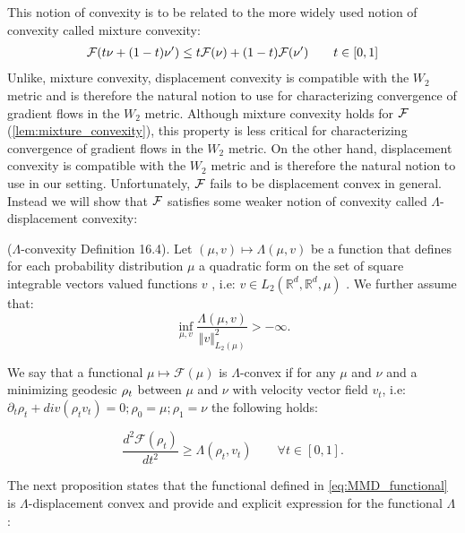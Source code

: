 This notion of convexity is to be related to the more widely used notion of convexity called mixture convexity:
\begin{align}
	{{\mathcal F}}(t\nu +(1-t)\nu')\leq t{{\mathcal F}}(\nu)+(1-t){{\mathcal F}}(\nu') \qquad t\in [0,1]
\end{align}
Unlike, mixture convexity, displacement convexity is compatible with the $W_2$ metric and is therefore the natural notion to use for characterizing convergence of gradient flows in the $W_2$ metric.
Although mixture convexity holds for ${{\mathcal F}}$ (\ref{lem:mixture_convexity}), this property is less critical for characterizing convergence of gradient flows in the $W_2$ metric. On the other hand, displacement convexity is compatible with the $W_2$ metric \cite{Bottou:2017} and is therefore the natural notion to use in our setting. Unfortunately, ${{\mathcal F}}$ fails to be displacement convex in general. Instead we will show that ${{\mathcal F}}$ satisfies some weaker notion of convexity called $\Lambda$-displacement convexity:
%
\begin{definition}
($\Lambda$-convexity \cite{Villani:2009} Definition 16.4). Let $(\mu,v)\mapsto\Lambda(\mu,v)$
be a function that defines for each probability distribution $\mu$
a quadratic form on the set of square integrable vectors valued functions
$v$ , i.e: $v\in L_{2}(\mathbb{R}^{d},\mathbb{R}^{d},\mu)$ . We
further assume that:
\[
\inf_{\mu,v}\frac{\Lambda(\mu,v)}{\Vert v\Vert_{L_{2}(\mu)}^{2}}>-\infty.
\]

We say that a functional $\mu\mapsto\mathcal{F}(\mu)$ is $\Lambda$-convex
if for any $\mu$ and $\nu$ and a minimizing geodesic $\text{\ensuremath{\rho_{t}}}$
between $\mu$ and $\nu$ with velocity vector field $v_{t}$, i.e:
$\partial_{t}\rho_{t}+div(\rho_{t}v_{t})=0;\rho_{0}=\mu;\rho_{1}=\nu$
the following holds:
\end{definition}
\[
\frac{d^{2}\mathcal{F}(\rho_{t})}{dt^{2}}\geq\Lambda(\rho_{t},v_{t})\qquad\forall t\in[0,1].
\]

The next proposition states that the functional defined in \ref{eq:MMD_functional} is $\Lambda$-displacement convex and provide and explicit expression for the functional $\Lambda$:

